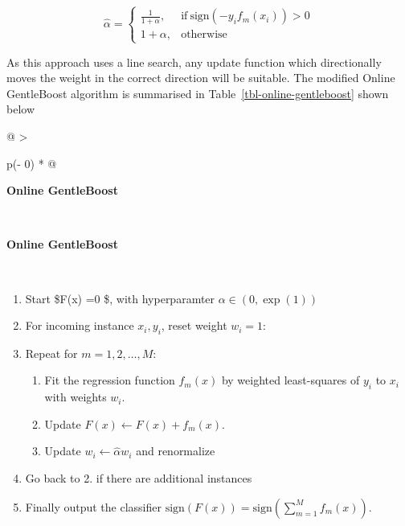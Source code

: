 \documentclass[
]{article}
\providecommand{\tightlist}{%
  \setlength{\itemsep}{0pt}\setlength{\parskip}{0pt}}\usepackage{longtable,booktabs,array}
\begin{document}
\[  \hat{\alpha} = \begin{cases}
      \frac{1}{1+\alpha}, & \text{if}\ \text{sign}(-y_i f_m(x_i)) > 0 \\
      1+\alpha, & \text{otherwise}
    \end{cases}\]

As this approach uses a line search, any update function which
directionally moves the weight in the correct direction will be
suitable. The modified Online GentleBoost algorithm is summarised in
Table~\ref{tbl-online-gentleboost} shown below

\hypertarget{tbl-online-gentleboost}{}
\begin{longtable}[]{@{}
  >{\raggedright\arraybackslash}p{(\columnwidth - 0\tabcolsep) * }@{}}
\caption{\label{tbl-online-gentleboost}Online GentleBoost algorithm
which is a modified version of GentleBoost to allow for online
learning}\tabularnewline
\toprule\noalign{}
\begin{minipage}[b]{\linewidth}\raggedright
\textbf{Online GentleBoost}
\end{minipage} \\
\midrule\noalign{}
\endfirsthead
\toprule\noalign{}
\begin{minipage}[b]{\linewidth}\raggedright
\textbf{Online GentleBoost}
\end{minipage} \\
\midrule\noalign{}
\endhead
\bottomrule\noalign{}
\endlastfoot
\begin{minipage}[t]{\linewidth}\raggedright
\begin{enumerate}
\def\labelenumi{\arabic{enumi}.}
\tightlist
\item
  Start \$F(x) =0 \$, with hyperparamter \(\alpha \in (0, \exp(1))\)
\item
  For incoming instance \(x_i, y_i\), reset weight \(w_i = 1\):
\item
  Repeat for \(m = 1,2, \dots, M\):

  \begin{enumerate}
  \def\labelenumii{\alph{enumii}.}
  \tightlist
  \item
    Fit the regression function \(f_m(x)\) by weighted least-squares of
    \(y_i\) to \(x_i\) with weights \(w_i\).
  \item
    Update \(F(x) \leftarrow F(x) + f_m(x)\).
  \item
    Update \(w_i \leftarrow \hat{\alpha} w_i\) and renormalize
    \textbar{}
  \end{enumerate}
\item
  Go back to 2. if there are additional instances
\item
  Finally output the classifier
  \(\text{sign}(F(x)) = \text{sign}(\sum_{m=1}^M f_m(x))\).
\end{enumerate}
\end{minipage} \\
\end{longtable}
\end{document}
